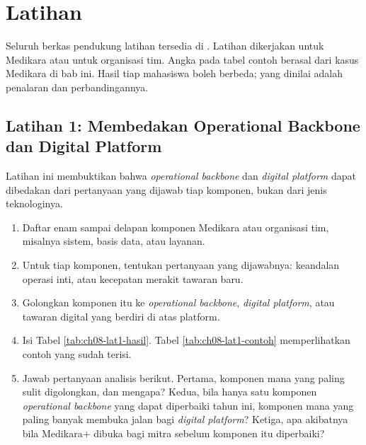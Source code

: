 \section{Latihan}

Seluruh berkas pendukung latihan tersedia di . Latihan dikerjakan
untuk Medikara atau untuk organisasi tim. Angka pada tabel contoh berasal dari kasus
Medikara di bab ini. Hasil tiap mahasiswa boleh berbeda; yang dinilai adalah penalaran dan
perbandingannya.

\subsection*{Latihan 1: Membedakan Operational Backbone dan Digital Platform}

Latihan ini membuktikan bahwa \textit{operational backbone} dan \textit{digital platform}
dapat dibedakan dari pertanyaan yang dijawab tiap komponen, bukan dari jenis teknologinya.

\begin{enumerate}
  \item Daftar enam sampai delapan komponen Medikara atau organisasi tim, misalnya sistem,
        basis data, atau layanan.
  \item Untuk tiap komponen, tentukan pertanyaan yang dijawabnya: keandalan operasi inti,
        atau kecepatan merakit tawaran baru.
  \item Golongkan komponen itu ke \textit{operational backbone}, \textit{digital
        platform}, atau tawaran digital yang berdiri di atas platform.
  \item Isi Tabel \ref{tab:ch08-lat1-hasil}. Tabel \ref{tab:ch08-lat1-contoh} memperlihatkan
        contoh yang sudah terisi.
  \item Jawab pertanyaan analisis berikut. Pertama, komponen mana yang paling sulit
        digolongkan, dan mengapa? Kedua, bila hanya satu komponen \textit{operational
        backbone} yang dapat diperbaiki tahun ini, komponen mana yang paling banyak
        membuka jalan bagi \textit{digital platform}? Ketiga, apa akibatnya bila Medikara+
        dibuka bagi mitra sebelum komponen itu diperbaiki?
\end{enumerate}


